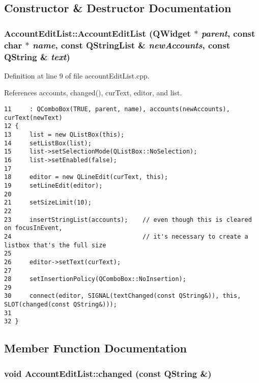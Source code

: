 \subsection{Constructor \& Destructor Documentation}
\hypertarget{classAccountEditList_a0}{
\subsubsection[AccountEditList]{\setlength{\rightskip}{0pt plus 5cm}Account\-Edit\-List::Account\-Edit\-List (QWidget $\ast$ {\em parent}, const char $\ast$ {\em name}, const QString\-List \& {\em new\-Accounts}, const QString \& {\em text})}}
\label{classAccountEditList_a0}


Definition at line 9 of file account\-Edit\-List.cpp.

References accounts, changed(), cur\-Text, editor, and list.

\footnotesize\begin{verbatim}11     : QComboBox(TRUE, parent, name), accounts(newAccounts), curText(newText)
12 {
13     list = new QListBox(this);
14     setListBox(list);
15     list->setSelectionMode(QListBox::NoSelection);
16     list->setEnabled(false);
17 
18     editor = new QLineEdit(curText, this);
19     setLineEdit(editor);
20 
21     setSizeLimit(10);
22 
23     insertStringList(accounts);    // even though this is cleared on focusInEvent,
24                                    // it's necessary to create a listbox that's the full size
25 
26     editor->setText(curText);
27     
28     setInsertionPolicy(QComboBox::NoInsertion);
29 
30     connect(editor, SIGNAL(textChanged(const QString&)), this, SLOT(changed(const QString&)));
31     
32 }
\end{verbatim}\normalsize 




\subsection{Member Function Documentation}
\hypertarget{classAccountEditList_k0}{
\subsubsection[changed]{\setlength{\rightskip}{0pt plus 5cm}void Account\-Edit\-List::changed (const QString \&)}}
\label{classAccountEditList_k0}


